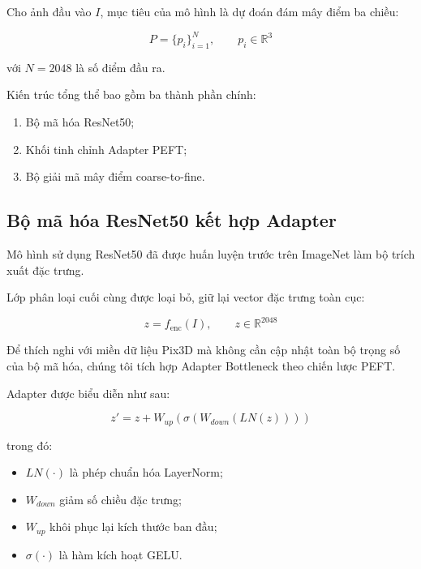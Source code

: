 \documentclass[conference,a4paper]{IEEEtran}
\begin{document}
Cho ảnh đầu vào $I$, mục tiêu của mô hình là dự đoán đám mây điểm ba chiều:

\begin{equation}
P = \{p_i\}_{i=1}^{N},
\qquad p_i \in \mathbb{R}^{3}
\end{equation}

với $N = 2048$ là số điểm đầu ra.

Kiến trúc tổng thể bao gồm ba thành phần chính:

\begin{enumerate}
    \item Bộ mã hóa ResNet50;
    \item Khối tinh chỉnh Adapter PEFT;
    \item Bộ giải mã mây điểm coarse-to-fine.
\end{enumerate}

\subsection{Bộ mã hóa ResNet50 kết hợp Adapter}

Mô hình sử dụng ResNet50 đã được huấn luyện trước trên ImageNet làm bộ trích xuất đặc trưng.

Lớp phân loại cuối cùng được loại bỏ, giữ lại vector đặc trưng toàn cục:

\begin{equation}
z = f_{\text{enc}}(I),
\qquad
z \in \mathbb{R}^{2048}
\end{equation}

Để thích nghi với miền dữ liệu Pix3D mà không cần cập nhật toàn bộ trọng số của bộ mã hóa, chúng tôi tích hợp Adapter Bottleneck theo chiến lược PEFT.

Adapter được biểu diễn như sau:

\begin{equation}
z' =
z +
W_{up}
\left(
\sigma
\left(
W_{down}
(
LN(z)
)
\right)
\right)
\end{equation}

trong đó:

\begin{itemize}
    \item $LN(\cdot)$ là phép chuẩn hóa LayerNorm;
    \item $W_{down}$ giảm số chiều đặc trưng;
    \item $W_{up}$ khôi phục lại kích thước ban đầu;
    \item $\sigma(\cdot)$ là hàm kích hoạt GELU.
\end{itemize}
\end{document}
